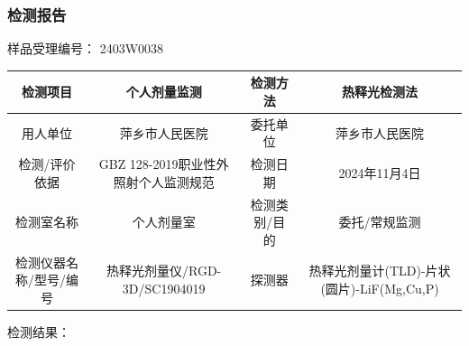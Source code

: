 \subsubsection{检测报告}

样品受理编号： 2403W0038


\begin{table}[H]
\centering
\begin{tabular}{|c|c|c|c|}
\hline
检测项目 & 个人剂量监测 & 检测方法 & 热释光检测法 \\
\hline
用人单位 & 萍乡市人民医院 & 委托单位 & 萍乡市人民医院 \\
\hline
检测/评价依据 & GBZ 128-2019职业性外照射个人监测规范 & 检测日期 & 2024年11月4日 \\
\hline
检测室名称 & 个人剂量室 & 检测类别/目的 & 委托/常规监测 \\
\hline
检测仪器名称/型号/编号 & 热释光剂量仪/RGD-3D/SC1904019 & 探测器 & 热释光剂量计(TLD)-片状(圆片)-LiF(Mg,Cu,P) \\
\hline
\end{tabular}
\end{table}


检测结果：

